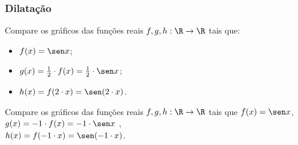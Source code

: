 \subsubsection{Dilatação}

\begin{example}
  Compare os gráficos das funções reais $f, g , h: \R \to \R$ tais que:
  \begin{itemize}
    \item $f(x) = \sen x$;
    \item $g(x) = \frac 1 2 \cdot f(x)  = \frac 1 2 \cdot \sen x $;
    \item $h(x)= f(2 \cdot x)= \sen (2 \cdot x)$.
  \end{itemize}

  \begin{center}
    
  \end{center}
  \begin{center}
    
  \end{center}
\end{example}

\begin{example}
Compare os gráficos das funções reais $f, g , h: \R \to \R$ tais que
$f(x) = \sen x$, \\ $g(x) = -1 \cdot f(x)  = -1 \cdot \sen x $ , \\
$h(x)= f(-1 \cdot x)= \sen (-1 \cdot x)$.

\begin{center}
  
\end{center}
\end{example}

